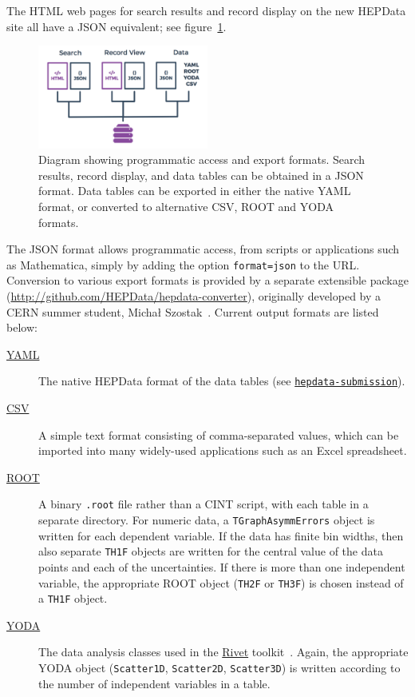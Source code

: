 \documentclass[a4paper]{jpconf}
\begin{document}
The HTML web pages for search results and record display on the new HEPData
site all have a JSON equivalent; see figure~\ref{fig:programmatic}.
%
\begin{figure}
  \begin{center}
    \includegraphics[width=0.5\textwidth]{Figures/programmatic_content.pdf}
    \hspace{2pc}%
    \begin{minipage}[b]{14pc}
      \caption{\label{fig:programmatic}Diagram showing programmatic access and
export formats.  Search results, record display, and data tables can be
obtained in a JSON format.  Data tables can be exported in either the native
YAML format, or converted to alternative CSV, ROOT and YODA formats.}
    \end{minipage}
  \end{center}
\end{figure}
%
The JSON format allows programmatic access, from scripts or applications such
as Mathematica, simply by adding the option \texttt{format=json} to the URL.
 Conversion to various export formats is provided by a separate extensible
package (\url{http://github.com/HEPData/hepdata-converter}), originally
developed by a CERN summer student, Micha\l{} Szostak~\cite{Szostak:2055193}.
Current output formats are listed below:
%
\begin{description}
\item [\href{http://yaml.org}{YAML}] The native HEPData format of the data
tables (see \href{http://github.com/HEPData/hepdata-submission}{\texttt{hepdata-submission}}).
\item [\href{https://en.wikipedia.org/wiki/Comma-separated_values}{CSV}] A
simple text format consisting of comma-separated values, which can be imported
into many widely-used applications such as an Excel spreadsheet.
\item [\href{https://root.cern.ch}{ROOT}] A binary \texttt{.root} file rather
than a CINT script, with each table in a separate directory.  For numeric data,
a \texttt{TGraphAsymmErrors} object is written for each dependent variable.  If
the data has finite bin widths, then also separate \texttt{TH1F} objects are
written for the central value of the data points and each of the uncertainties.
 If there is more than one independent variable, the appropriate ROOT object
(\texttt{TH2F} or \texttt{TH3F}) is chosen instead of a \texttt{TH1F} object.
\item [\href{https://yoda.hepforge.org}{YODA}] The data analysis classes used
in the \href{https://rivet.hepforge.org}{Rivet} toolkit~\cite{Buckley:2010ar}.
 Again, the appropriate YODA object (\texttt{Scatter1D}, \texttt{Scatter2D},
\texttt{Scatter3D}) is written according to the number of independent variables
in a table.
\end{description}
\end{document}
